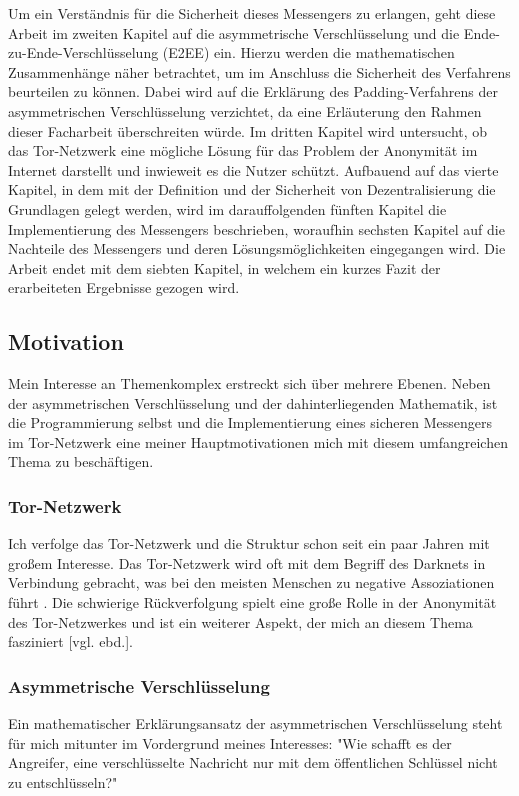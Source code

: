 \documentclass[a4paper,ngerman, headheight=28pt,12pt]{scrartcl}
\newcommand{\vcite}[1]{\cite[vgl.][]{#1}}
\newcommand{\vebd}{[vgl. ebd.]}
\begin{document}
Um ein Verständnis für die Sicherheit dieses Messengers zu erlangen, geht diese Arbeit im zweiten Kapitel auf die asymmetrische Verschlüsselung und die Ende-zu-Ende-Verschlüsselung (E2EE) ein. Hierzu werden die mathematischen Zusammenhänge näher betrachtet, um im Anschluss die Sicherheit des Verfahrens beurteilen zu können.
Dabei wird auf die Erklärung des Padding-Verfahrens der asymmetrischen Verschlüsselung verzichtet, da eine Erläuterung den Rahmen dieser Facharbeit überschreiten würde. Im dritten Kapitel wird untersucht, ob das Tor-Netzwerk eine mögliche Lösung für das Problem der Anonymität im Internet darstellt und inwieweit es die Nutzer schützt.
Aufbauend auf das vierte Kapitel, in dem mit der Definition und der Sicherheit von Dezentralisierung die Grundlagen gelegt werden, wird im darauffolgenden fünften Kapitel die Implementierung des Messengers beschrieben, woraufhin sechsten Kapitel auf die Nachteile des Messengers und deren Lösungsmöglichkeiten eingegangen wird. Die Arbeit endet mit dem siebten Kapitel, in welchem ein kurzes Fazit der erarbeiteten Ergebnisse gezogen wird.

\subsection{Motivation}
Mein Interesse an Themenkomplex erstreckt sich über mehrere Ebenen. Neben der asymmetrischen Verschlüsselung und der dahinterliegenden Mathematik, ist die Programmierung selbst und die Implementierung eines sicheren Messengers im Tor-Netzwerk eine meiner Hauptmotivationen mich mit diesem umfangreichen Thema zu beschäftigen.
\subsubsection{Tor-Netzwerk}
Ich verfolge das Tor-Netzwerk und die Struktur schon seit ein paar Jahren mit großem Interesse. Das Tor-Netzwerk wird oft mit dem Begriff des Darknets in Verbindung gebracht, was bei den meisten Menschen zu negative Assoziationen führt \vcite{BsiTorDarknet}. Die schwierige Rückverfolgung spielt eine große Rolle in der Anonymität des Tor-Netzwerkes und ist ein weiterer Aspekt, der mich an diesem Thema fasziniert \vebd.

\subsubsection{Asymmetrische Verschlüsselung}
Ein mathematischer Erklärungsansatz der asymmetrischen Verschlüsselung steht für mich mitunter im Vordergrund meines Interesses: "Wie schafft es der Angreifer, eine verschlüsselte Nachricht nur mit dem öffentlichen Schlüssel nicht zu entschlüsseln?"
\end{document}
